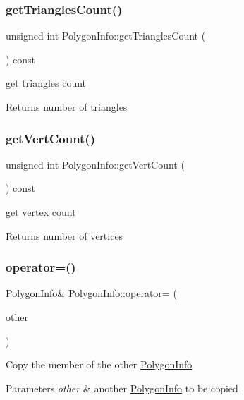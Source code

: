 \subsubsection{\texorpdfstring{get\+Triangles\+Count()}{getTrianglesCount()}}
{\footnotesize\ttfamily unsigned int Polygon\+Info\+::get\+Triangles\+Count (\begin{DoxyParamCaption}{ }\end{DoxyParamCaption}) const}

get triangles count \begin{DoxyReturn}{Returns}
number of triangles 
\end{DoxyReturn}
\mbox{\label{classPolygonInfo_ga266fe3f8a962c0281b381ad1a55835bd}} 
\subsubsection{\texorpdfstring{get\+Vert\+Count()}{getVertCount()}}
{\footnotesize\ttfamily unsigned int Polygon\+Info\+::get\+Vert\+Count (\begin{DoxyParamCaption}{ }\end{DoxyParamCaption}) const}

get vertex count \begin{DoxyReturn}{Returns}
number of vertices 
\end{DoxyReturn}
\mbox{\label{classPolygonInfo_ga93a62a7d94006f7a4cb05e8471486200}} 
\subsubsection{\texorpdfstring{operator=()}{operator=()}}
{\footnotesize\ttfamily \hyperlink{classPolygonInfo}{Polygon\+Info}\& Polygon\+Info\+::operator= (\begin{DoxyParamCaption}\item[{const \hyperlink{classPolygonInfo}{Polygon\+Info} \&}]{other }\end{DoxyParamCaption})}

Copy the member of the other \hyperlink{classPolygonInfo}{Polygon\+Info} 
\begin{DoxyParams}{Parameters}
{\em other} & another \hyperlink{classPolygonInfo}{Polygon\+Info} to be copied \\
\hline
\end{DoxyParams}
\mbox{\label{classPolygonInfo_ga119fbf0478829130e57de44eeddb37ea}} 
